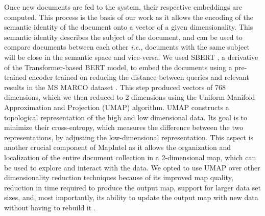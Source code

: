 \documentclass[a4paper]{article}
\begin{document}
Once new documents are fed to the system, their respective embeddings are computed. This process is the basis of our work as it allows the encoding of the semantic identity of the document onto a vector of a given dimensionality. This semantic identity describes the subject of the document, and can be used to compare documents between each other \textit{i.e.}, documents with the same subject will be close in the semantic space and vice-versa. We used SBERT \citep{reimers2019}, a derivative of the Transformer-based BERT model, to embed the documents using a pre-trained encoder trained on reducing the distance between queries and relevant results in the MS MARCO dataset \citep{bajaj2018}. This step produced vectors of 768 dimensions, which we then reduced to 2 dimensions using the Uniform Manifold Approximation and Projection (UMAP) \citep{mcinnes2020} algorithm. UMAP constructs a topological representation of the high and low dimensional data. Its goal is to minimize their cross-entropy, which measures the difference between the two representations, by adjusting the low-dimensional representation. This aspect is another crucial component of MapIntel as it allows the organization and localization of the entire document collection in a 2-dimensional map, which can be used to explore and interact with the data. We opted to use UMAP over other dimensionality reduction techniques because of its improved map quality, reduction in time required to produce the output map, support for larger data set sizes, and, most importantly, its ability to update the output map with new data without having to rebuild it \citep{mcinnes2020}.
\end{document}
